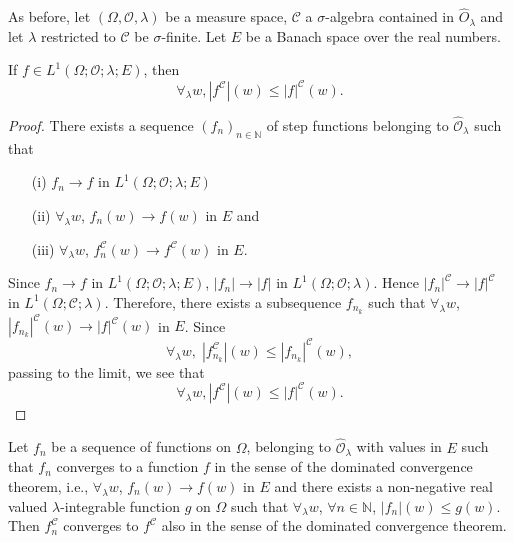 As before, let $(\Omega, \mathscr{O}, \lambda)$ be a measure space,
$\mathscr{C}$ a $\sigma$-algebra contained in $\hat{O}_\lambda$ and
let $\lambda$ restricted to $\mathscr{C}$ be $\sigma$-finite. Let $E$
be a Banach space over the real numbers. 

\begin{proposition}\label{part1:chap1:prop9}
 If $f\in L^1 (\Omega; \mathscr{O};
  \lambda; E)$, then 
$$
\forall_\lambda w, |f^\mathscr{C}| (w) \leq |f|^\mathscr{C} (w). 
$$
\end{proposition}


\begin{proof}
There exists a sequence $(f_n)_{n \in \mathbb{N}}$ of step functions
belonging to $\hat{\mathscr{O}}_\lambda$ such that 
\begin{itemize}
\item[{\rm (i)}] $f_n \to f$ in $L^1(\Omega; \mathscr{O}; \lambda; E)$ 

\item[{\rm (ii)}] $\forall_\lambda w$, $f_n(w) \to f(w)$ in $E$ \quad  and 

\item[{\rm (iii)}] $\forall_\lambda w$, $f^\mathscr{C}_n(w) \to
  f^\mathscr{C}(w)$ in $E$. 
\end{itemize}

Since $f_n \to f$ in $L^1 (\Omega;  \mathscr{O}; \lambda; E)$, $|f_n|
\to |f|$ in $L^1(\Omega; \mathscr{O}; \lambda)$. Hence
$|f_n|^\mathscr{C} \to |f|^\mathscr{C}$ in $L^1 (\Omega; \mathscr{C};
\lambda)$. Therefore, there exists a subsequence $f_{n_k}$ such that
$\forall_\lambda w$, $|f_{n_k}|^\mathscr{C} (w) \to |f|^\mathscr{C}
(w) $ in $E$. Since 
$$
\forall_\lambda w, \; |f^\mathscr{C}_{n_k}| (w) \leq |f_{n_k}|^\mathscr{C}(w),
$$\pageoriginale
passing to the limit, we see that 
$$
\forall_\lambda w, |f^\mathscr{C}| (w) \leq |f|^\mathscr{C} (w). 
$$
\end{proof}

\begin{proposition}\label{part1:chap1:prop10} 
Let $f_n$ be a sequence of functions on $\Omega$, belonging to
$\hat{\mathscr{O}}_\lambda$ with values in $E$ such that $f_n$
converges to a function $f$ in the sense of the dominated convergence
theorem, i.e., $\forall_\lambda w$, $f_n (w) \to f(w)$ in $E$ and
there exists a non-negative real valued $\lambda$-integrable function
$g$ on $\Omega$ such that $\forall_\lambda w$, $\forall n \in
\mathbb{N}$, $|f_n| (w) \leq g(w)$. Then $f^\mathscr{C}_n$ converges
to $f^\mathscr{C}$ also in the sense of the dominated convergence
theorem. 
 \end{proposition}


